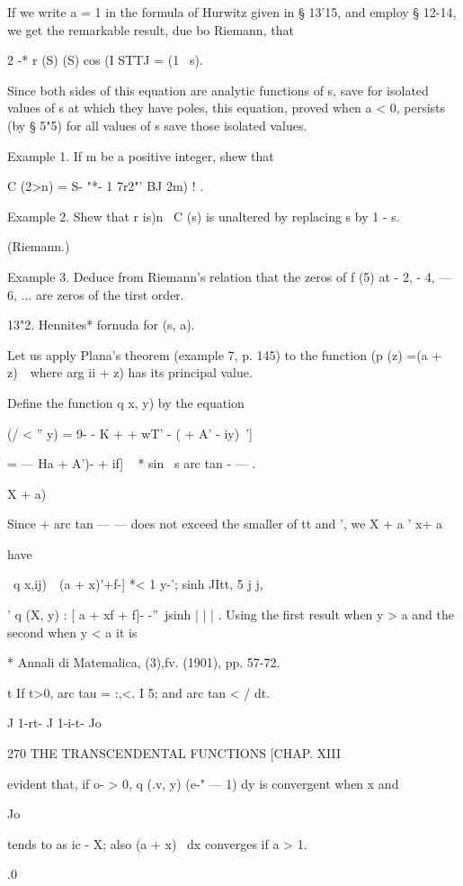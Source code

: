 If we write a = 1 in the formula of Hurwitz given in § 13'15, and
employ § 12-14, we get the remarkable result, due bo Riemann, that

2 -* r (S) (S) cos (I STTJ = (1 \ s).

Since both sides of this equation are analytic functions of s, save
for isolated values of s at which they have poles, this equation,
proved when a < 0, persists (by § 5"5) for all values of s save those
isolated values.

Example 1. If m be a positive integer, shew that

C (2>n) = S- "*- 1 7r2"' BJ 2m) ! .

Example 2. Shew that r is)n~ C (s) is unaltered by replacing s by 1 -
s.

(Riemann.)

Example 3. Deduce from Riemann's relation that the zeros of f (5) at -
2, - 4, — 6, ... are zeros of the tirst order.

13"2. Hennites* fornuda for (s, a).

Let us apply Plana's theorem (example 7, p. 145) to the function (p
(z) =(a + z)~\ where arg ii + z) has its principal value.

Define the function q x, y) by the equation

(/ < '' y) = 9- - K + + wT' - ( + A' - iy)~']

= — Ha + A')- + if] ~ * sin \ s arc tan - — .

  X + a)

Since + arc tan — — does not exceed the smaller of tt and ', we X + a
' x+ a

have

\ q x,ij)\ \ (a + x)'+f-] *< 1 y-'; sinh JItt, 5 j j,

' q (X, y) : [ a + xf + f]- -''\ jsinh | | | . Using the first result
when y > a and the second when y < a it is

* Annali di Matemalica, (3),fv. (1901), pp. 57-72.

t If t>0, arc tau = :,<. I 5; and arc tan < / dt.

J 1-rt- J 1-i-t- Jo

270 THE TRANSCENDENTAL FUNCTIONS [CHAP. XIII

evident that, if o- > 0, q (.v, y) (e-" — 1) dy is convergent when x
and

Jo

tends to as ic - X; also (a + x)~ dx converges if a > 1.

.0

